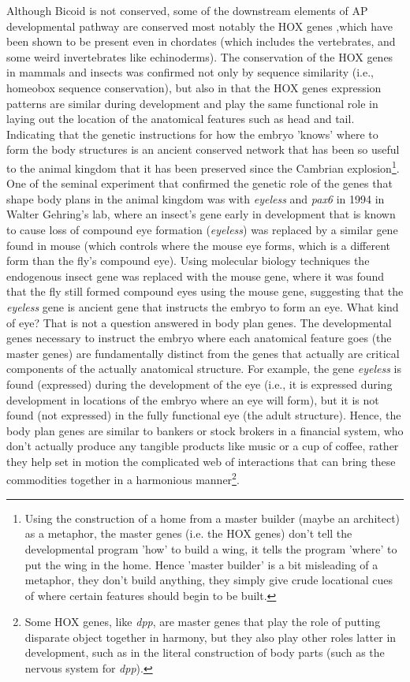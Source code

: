 Although Bicoid is not conserved, some of the downstream elements of AP developmental pathway are conserved most notably the HOX genes ,which have been shown to be present even in chordates (which includes the vertebrates, and some weird invertebrates like echinoderms).  The conservation of the HOX genes in mammals and insects was confirmed not only by sequence similarity (i.e., homeobox sequence conservation), but also in that the HOX genes expression patterns are similar during development and play the same functional role in laying out the location of the anatomical features such as head and tail.  Indicating that the genetic instructions for how the embryo 'knows' where to form the body structures is an ancient conserved network that has been so useful to the animal kingdom that it has been preserved since the Cambrian explosion\footnote{Using the construction of a home from a master builder (maybe an architect) as a metaphor, the master genes (i.e. the HOX genes) don't tell the developmental program 'how' to build a wing, it tells the program 'where' to put the wing in the home.  Hence 'master builder' is a bit misleading of a metaphor, they don't build anything, they simply give crude locational cues of where certain features should begin to be built.}.  One of the seminal experiment that confirmed the genetic role of the genes that shape body plans in the animal kingdom was with \textit{eyeless} and \textit{pax6} in 1994 in Walter Gehring's lab\cite{pmid7914031}, where an insect's gene early in development that is known to cause loss of compound eye formation (\textit{eyeless}) was replaced by a similar gene found in mouse (which controls where the mouse eye forms, which is a different form than the fly's compound eye).  Using molecular biology techniques the endogenous insect gene was replaced with the mouse gene, where it was found that the fly still formed compound eyes using the mouse gene, suggesting that the \textit{eyeless} gene is ancient gene that instructs the embryo to form an eye.  What kind of eye?  That is not a question answered in body plan genes.  The developmental genes necessary to instruct the embryo where each anatomical feature goes (the master genes) are fundamentally distinct from the genes that actually are critical components of the actually anatomical structure.  For example, the gene \textit{eyeless} is found (expressed) during the development of the eye (i.e., it is expressed during development in locations of the embryo where an eye will form), but it is not found (not expressed) in the fully functional eye (the adult structure).  Hence, the body plan genes are similar to bankers or stock brokers in a financial system, who don't actually produce any tangible products like music or a cup of coffee, rather they help set in motion the complicated web of interactions that can bring these commodities together in a harmonious manner\footnote{Some HOX genes, like \textit{dpp}, are master genes that play the role of putting disparate object together in harmony, but they also play other roles latter in development, such as in the literal construction of body parts (such as the nervous system for \textit{dpp}).}. 

